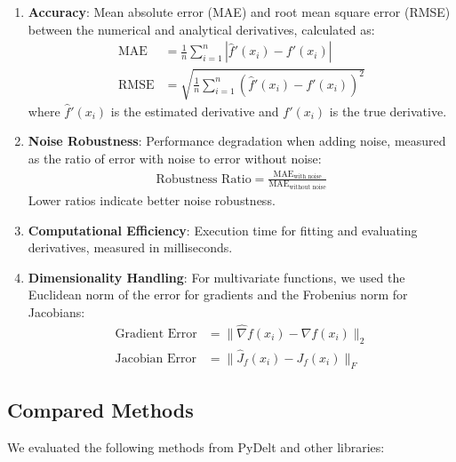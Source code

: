 \documentclass[11pt,a4paper]{article}
\begin{document}
\begin{enumerate}
    \item \textbf{Accuracy}: Mean absolute error (MAE) and root mean square error (RMSE) between the numerical and analytical derivatives, calculated as:
    \begin{align}
        \text{MAE} &= \frac{1}{n}\sum_{i=1}^{n}|\hat{f}'(x_i) - f'(x_i)| \\
        \text{RMSE} &= \sqrt{\frac{1}{n}\sum_{i=1}^{n}(\hat{f}'(x_i) - f'(x_i))^2}
    \end{align}
    where $\hat{f}'(x_i)$ is the estimated derivative and $f'(x_i)$ is the true derivative.
    
    \item \textbf{Noise Robustness}: Performance degradation when adding noise, measured as the ratio of error with noise to error without noise:
    \begin{align}
        \text{Robustness Ratio} = \frac{\text{MAE}_{\text{with noise}}}{\text{MAE}_{\text{without noise}}}
    \end{align}
    Lower ratios indicate better noise robustness.
    
    \item \textbf{Computational Efficiency}: Execution time for fitting and evaluating derivatives, measured in milliseconds.
    
    \item \textbf{Dimensionality Handling}: For multivariate functions, we used the Euclidean norm of the error for gradients and the Frobenius norm for Jacobians:
    \begin{align}
        \text{Gradient Error} &= \|\hat{\nabla}f(x_i) - \nabla f(x_i)\|_2 \\
        \text{Jacobian Error} &= \|\hat{J}_f(x_i) - J_f(x_i)\|_F
    \end{align}
\end{enumerate}

\subsection{Compared Methods}

We evaluated the following methods from PyDelt and other libraries:
\end{document}
